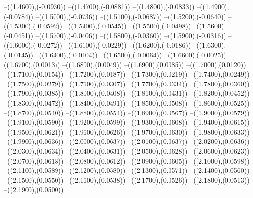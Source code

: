 {	--({\sx*(1.4600)},{\sy*(-0.0930)})
	--({\sx*(1.4700)},{\sy*(-0.0881)})
	--({\sx*(1.4800)},{\sy*(-0.0833)})
	--({\sx*(1.4900)},{\sy*(-0.0784)})
	--({\sx*(1.5000)},{\sy*(-0.0736)})
	--({\sx*(1.5100)},{\sy*(-0.0687)})
	--({\sx*(1.5200)},{\sy*(-0.0640)})
	--({\sx*(1.5300)},{\sy*(-0.0592)})
	--({\sx*(1.5400)},{\sy*(-0.0545)})
	--({\sx*(1.5500)},{\sy*(-0.0498)})
	--({\sx*(1.5600)},{\sy*(-0.0451)})
	--({\sx*(1.5700)},{\sy*(-0.0406)})
	--({\sx*(1.5800)},{\sy*(-0.0360)})
	--({\sx*(1.5900)},{\sy*(-0.0316)})
	--({\sx*(1.6000)},{\sy*(-0.0272)})
	--({\sx*(1.6100)},{\sy*(-0.0229)})
	--({\sx*(1.6200)},{\sy*(-0.0186)})
	--({\sx*(1.6300)},{\sy*(-0.0145)})
	--({\sx*(1.6400)},{\sy*(-0.0104)})
	--({\sx*(1.6500)},{\sy*(-0.0064)})
	--({\sx*(1.6600)},{\sy*(-0.0025)})
	--({\sx*(1.6700)},{\sy*(0.0013)})
	--({\sx*(1.6800)},{\sy*(0.0049)})
	--({\sx*(1.6900)},{\sy*(0.0085)})
	--({\sx*(1.7000)},{\sy*(0.0120)})
	--({\sx*(1.7100)},{\sy*(0.0154)})
	--({\sx*(1.7200)},{\sy*(0.0187)})
	--({\sx*(1.7300)},{\sy*(0.0219)})
	--({\sx*(1.7400)},{\sy*(0.0249)})
	--({\sx*(1.7500)},{\sy*(0.0279)})
	--({\sx*(1.7600)},{\sy*(0.0307)})
	--({\sx*(1.7700)},{\sy*(0.0334)})
	--({\sx*(1.7800)},{\sy*(0.0360)})
	--({\sx*(1.7900)},{\sy*(0.0385)})
	--({\sx*(1.8000)},{\sy*(0.0408)})
	--({\sx*(1.8100)},{\sy*(0.0431)})
	--({\sx*(1.8200)},{\sy*(0.0452)})
	--({\sx*(1.8300)},{\sy*(0.0472)})
	--({\sx*(1.8400)},{\sy*(0.0491)})
	--({\sx*(1.8500)},{\sy*(0.0508)})
	--({\sx*(1.8600)},{\sy*(0.0525)})
	--({\sx*(1.8700)},{\sy*(0.0540)})
	--({\sx*(1.8800)},{\sy*(0.0554)})
	--({\sx*(1.8900)},{\sy*(0.0567)})
	--({\sx*(1.9000)},{\sy*(0.0579)})
	--({\sx*(1.9100)},{\sy*(0.0590)})
	--({\sx*(1.9200)},{\sy*(0.0599)})
	--({\sx*(1.9300)},{\sy*(0.0608)})
	--({\sx*(1.9400)},{\sy*(0.0615)})
	--({\sx*(1.9500)},{\sy*(0.0621)})
	--({\sx*(1.9600)},{\sy*(0.0626)})
	--({\sx*(1.9700)},{\sy*(0.0630)})
	--({\sx*(1.9800)},{\sy*(0.0633)})
	--({\sx*(1.9900)},{\sy*(0.0636)})
	--({\sx*(2.0000)},{\sy*(0.0637)})
	--({\sx*(2.0100)},{\sy*(0.0637)})
	--({\sx*(2.0200)},{\sy*(0.0636)})
	--({\sx*(2.0300)},{\sy*(0.0634)})
	--({\sx*(2.0400)},{\sy*(0.0631)})
	--({\sx*(2.0500)},{\sy*(0.0628)})
	--({\sx*(2.0600)},{\sy*(0.0623)})
	--({\sx*(2.0700)},{\sy*(0.0618)})
	--({\sx*(2.0800)},{\sy*(0.0612)})
	--({\sx*(2.0900)},{\sy*(0.0605)})
	--({\sx*(2.1000)},{\sy*(0.0598)})
	--({\sx*(2.1100)},{\sy*(0.0589)})
	--({\sx*(2.1200)},{\sy*(0.0580)})
	--({\sx*(2.1300)},{\sy*(0.0571)})
	--({\sx*(2.1400)},{\sy*(0.0560)})
	--({\sx*(2.1500)},{\sy*(0.0550)})
	--({\sx*(2.1600)},{\sy*(0.0538)})
	--({\sx*(2.1700)},{\sy*(0.0526)})
	--({\sx*(2.1800)},{\sy*(0.0513)})
	--({\sx*(2.1900)},{\sy*(0.0500)})
}
